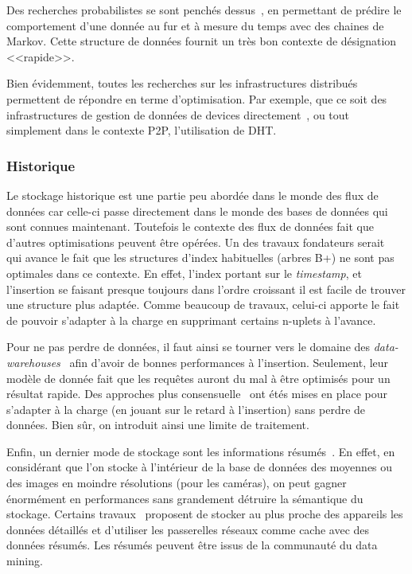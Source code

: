 Des recherches probabilistes se sont penchés dessus~\cite{Bhattacharya:mist}, en permettant de prédire le comportement d'une donnée au fur et à mesure du temps avec des chaines de Markov. Cette structure de données fournit un très bon contexte de désignation <<rapide>>.

Bien évidemment, toutes les recherches sur les infrastructures distribués permettent de répondre en terme d'optimisation. Par exemple, que ce soit des infrastructures de gestion de données de devices directement~\cite{Gurgen:sstreamware}, ou tout simplement dans le contexte P2P, l'utilisation de DHT.
\subsubsection{Historique}
Le stockage historique est une partie peu abordée dans le monde des flux de données car celle-ci passe directement dans le monde des bases de données qui sont connues maintenant. Toutefois le contexte des flux de données fait que d'autres optimisations peuvent être opérées. Un des travaux fondateurs serait~\cite{Chandrasekaran:oscar} qui avance le fait que les structures d'index habituelles (arbres B+) ne sont pas optimales dans ce contexte. En effet, l'index portant sur le \textit{timestamp}, et l'insertion se faisant presque toujours dans l'ordre croissant il est facile de trouver une structure plus adaptée. Comme beaucoup de travaux, celui-ci apporte le fait de pouvoir s'adapter à la charge en supprimant certains n-uplets à l'avance.

Pour ne pas perdre de données, il faut ainsi se tourner vers le domaine des \textit{data-warehouses}~\cite{Chaudhuri:warehouse} afin d'avoir de bonnes performances à l'insertion. Seulement, leur modèle de donnée fait que les requêtes auront du mal à être optimisés pour un résultat rapide. Des approches plus consensuelle~\cite{Petit:historical} ont étés mises en place pour s'adapter à la charge (en jouant sur le retard à l'insertion) sans perdre de données. Bien sûr, on introduit ainsi une limite de traitement. 

Enfin, un dernier mode de stockage sont les informations résumés~\cite{Diao:stonedb}. En effet, en considérant que l'on stocke à l'intérieur de la base de données des moyennes ou des images en moindre résolutions (pour les caméras), on peut gagner énormément en performances sans grandement détruire la sémantique du stockage. Certains travaux~\cite{Diao:stonedb} proposent de stocker au plus proche des appareils les données détaillés et d'utiliser les passerelles réseaux comme cache avec des données résumés. Les résumés peuvent être issus de la communauté du data mining. 
